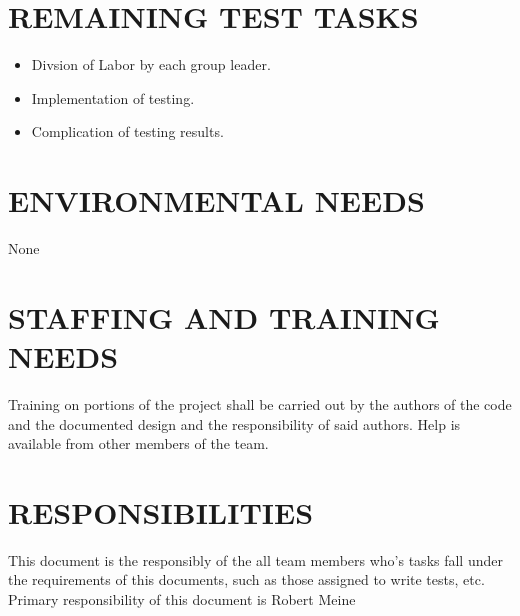 \documentclass[report]{article}
\begin{document}
\section[REMAINING TEST TASKS]{REMAINING TEST TASKS}

\begin{itemize}
\item Divsion of Labor by each group leader.
\item Implementation of testing.
\item Complication of testing results.
\end{itemize}

\section[EVIRONMENTAL NEEDS]{ENVIRONMENTAL NEEDS}
None

\section[STAFFING AND TRAINING NEEDS]{STAFFING AND TRAINING NEEDS}
Training on portions of the project shall be carried out by the authors of the code and the documented design and the responsibility of said authors. Help is available from other members of the team.


\section[RESPONSIBILITIES]{RESPONSIBILITIES}
This document is the responsibly of the all team members who's tasks fall under the requirements of this documents, such as those assigned to write tests, etc. Primary responsibility of this document is Robert Meine
\end{document}
